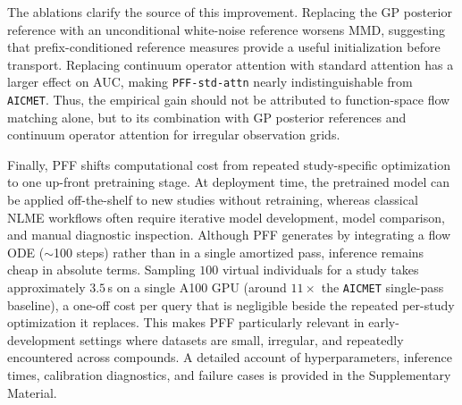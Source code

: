 The ablations clarify the source of this improvement.
%
Replacing the GP posterior reference with an unconditional white-noise reference worsens MMD, suggesting that prefix-conditioned reference measures provide a useful initialization before transport.
%
Replacing continuum operator attention with standard attention has a larger effect on AUC, making \texttt{PFF-std-attn} nearly indistinguishable from \texttt{AICMET}.
%
Thus, the empirical gain should not be attributed to function-space flow matching alone, but to its combination with GP posterior references and continuum operator attention for irregular observation grids.

Finally, PFF shifts computational cost from repeated study-specific optimization to one up-front pretraining stage.
%
At deployment time, the pretrained model can be applied off-the-shelf to new studies without retraining, whereas classical NLME workflows often require iterative model development, model comparison, and manual diagnostic inspection. 
%
Although PFF generates by integrating a flow ODE ($\sim$100 steps) rather than in a single amortized pass, inference remains cheap in absolute terms. Sampling $100$ virtual individuals for a study takes approximately $3.5$\,s on a single A100 GPU (around $11\times$ the \texttt{AICMET} single-pass baseline), a one-off cost per query that is negligible beside the repeated per-study optimization it replaces.
%
This makes PFF particularly relevant in early-development settings where datasets are small, irregular,  and repeatedly encountered across compounds.
A detailed account of hyperparameters, inference times, calibration diagnostics, and failure cases is provided in the Supplementary Material.

